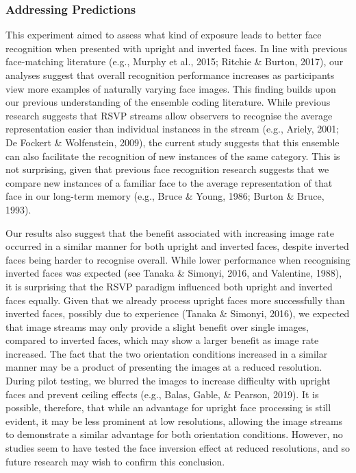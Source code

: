 \documentclass[
  english,
  man]{apa6}
\begin{document}
\hypertarget{addressing-predictions}{%
\subsubsection{Addressing Predictions}\label{addressing-predictions}}

This experiment aimed to assess what kind of exposure leads to better face recognition when presented with upright and inverted faces. In line with previous face-matching literature (e.g., Murphy et al., 2015; Ritchie \& Burton, 2017), our analyses suggest that overall recognition performance increases as participants view more examples of naturally varying face images. This finding builds upon our previous understanding of the ensemble coding literature. While previous research suggests that RSVP streams allow observers to recognise the average representation easier than individual instances in the stream (e.g., Ariely, 2001; De Fockert \& Wolfenstein, 2009), the current study suggests that this ensemble can also facilitate the recognition of new instances of the same category. This is not surprising, given that previous face recognition research suggests that we compare new instances of a familiar face to the average representation of that face in our long-term memory (e.g., Bruce \& Young, 1986; Burton \& Bruce, 1993).

Our results also suggest that the benefit associated with increasing image rate occurred in a similar manner for both upright and inverted faces, despite inverted faces being harder to recognise overall. While lower performance when recognising inverted faces was expected (see Tanaka \& Simonyi, 2016, and Valentine, 1988), it is surprising that the RSVP paradigm influenced both upright and inverted faces equally. Given that we already process upright faces more successfully than inverted faces, possibly due to experience (Tanaka \& Simonyi, 2016), we expected that image streams may only provide a slight benefit over single images, compared to inverted faces, which may show a larger benefit as image rate increased. The fact that the two orientation conditions increased in a similar manner may be a product of presenting the images at a reduced resolution. During pilot testing, we blurred the images to increase difficulty with upright faces and prevent ceiling effects (e.g., Balas, Gable, \& Pearson, 2019). It is possible, therefore, that while an advantage for upright face processing is still evident, it may be less prominent at low resolutions, allowing the image streams to demonstrate a similar advantage for both orientation conditions. However, no studies seem to have tested the face inversion effect at reduced resolutions, and so future research may wish to confirm this conclusion.
\end{document}
